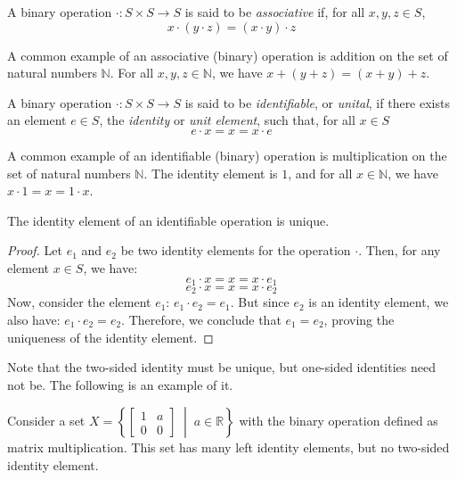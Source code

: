 \documentclass[
	11pt, %
	fleqn, %
	a4paper, %
]{LegrandOrangeBook}
\begin{document}
\begin{definition}[Associative]
    A binary operation $\cdot: S \times S \to S$ is said to be \emph{associative} if, for all $x,y,z \in S$, 
    \[ x \cdot (y \cdot z) = (x \cdot y) \cdot z \]
\end{definition}

\begin{example}
    A common example of an associative (binary) operation is addition on the set of natural numbers $\mathbb{N}$. For all $x,y,z \in \mathbb{N}$, we have $x + (y + z) = (x + y) + z$.
\end{example}

\begin{definition}[Identifiable]
    A binary operation $\cdot: S \times S \to S$ is said to be \emph{identifiable}, or \emph{unital}, if there exists an element $e \in S$, the \emph{identity} or \emph{unit element}, such that, for all $x \in S$
    \[ e \cdot x = x = x \cdot e \]
\end{definition}

\begin{example}
    A common example of an identifiable (binary) operation is multiplication on the set of natural numbers $\mathbb{N}$. The identity element is $1$, and for all $x \in \mathbb{N}$, we have $x \cdot 1 = x = 1 \cdot x$.
\end{example}

\begin{proposition}
    The identity element of an identifiable operation is unique.
\end{proposition}

\begin{proof}
    Let $e_1$ and $e_2$ be two identity elements for the operation $\cdot$. Then, for any element $x \in S$, we have:
    \[ e_1 \cdot x = x = x \cdot e_1 \]
    \[ e_2 \cdot x = x = x \cdot e_2 \]
    Now, consider the element $e_1$: $e_1 \cdot e_2 = e_1$.
    But since $e_2$ is an identity element, we also have: $e_1 \cdot e_2 = e_2$.
    Therefore, we conclude that $e_1 = e_2$, proving the uniqueness of the identity element.
\end{proof}

Note that the two-sided identity must be unique, but one-sided identities need not be. The following is an example of it.

\begin{example}
    Consider a set $X = \left\{ \begin{bmatrix}
        1 & a \\
        0 & 0 
    \end{bmatrix} \; \middle| \; a \in \mathbb{R} \right\}$ with the binary operation defined as matrix multiplication. This set has many left identity elements, but no two-sided identity element.
\end{example}
\end{document}
